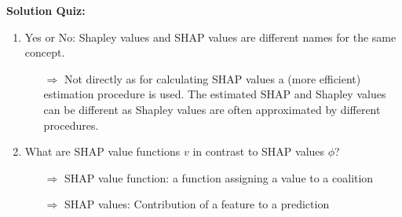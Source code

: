 \textbf{Solution Quiz:}\\\noindent
\medskip

\begin{enumerate}
    \item Yes or No: Shapley values and SHAP values are different names for the same concept.
    \begin{itemize}
    	\item[$\Rightarrow$] Not directly as for calculating SHAP values a (more efficient) estimation procedure is used. The estimated SHAP and Shapley values can be different as Shapley values are often approximated by different procedures.
    \end{itemize}
    \item What are SHAP value functions $v$ in contrast to SHAP values $\phi$?
    \begin{itemize}
    	\item[$\Rightarrow$] SHAP value function: a function assigning a value to a coalition
    	\item[$\Rightarrow$] SHAP values: Contribution of a feature to a prediction
    \end{itemize}
\end{enumerate}
